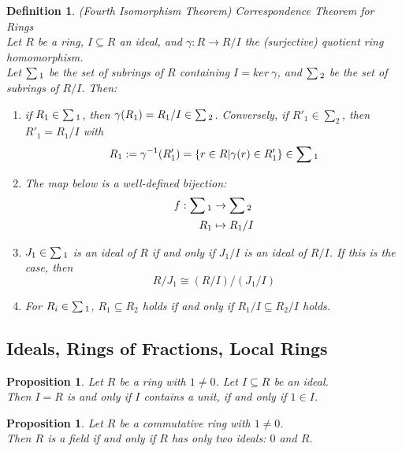 \documentclass[a4paper,8pt]{article}
\newcommand{\hlt}[1]{\textit{{\color{blue}#1}}}
\theoremstyle{theorem}
\newtheorem{proposition}[theorem]{Proposition}
\newtheorem{definition}[theorem]{Definition}
\begin{document}
\begin{definition}
\hlt{(Fourth Isomorphism Theorem)} Correspondence Theorem for Rings\\
Let $R$ be a ring, $I \subseteq R$ an ideal, and $\gamma: R \rightarrow R/I$ the (surjective) quotient ring homomorphism.\\
Let $\sum \textsubscript{1}$ be the set of subrings of $R$ containing $I = ker \ \gamma$, and $\sum \textsubscript{2}$ be the set of subrings of $R/I$. Then:
\begin{enumerate}[label=(\roman*)]
\item if $R_1 \in \sum \textsubscript{1}$, then $\gamma(R_1) = R_1/I \in \sum \textsubscript{2}$. Conversely, if $R'_1 \in \sum_2$, then  $R'_1 = R_1/I$ with
\begin{equation}
R_1:=\gamma^{-1}(R'_1) = \{r\in R | \gamma(r) \in R'_1\} \in \sum \textsubscript{1} \nonumber
\end{equation}
\item The map below is a well-defined bijection:
\begin{align}
f: \sum \textsubscript{1} &\rightarrow \sum \textsubscript{2} \nonumber \\
R_1 &\mapsto R_1/I \nonumber
\end{align}
\item $J_1 \in \sum \textsubscript{1}$ is an ideal of $R$ if and only if $J_1/I$ is an ideal of $R/I$. If this is the case, then 
\begin{equation}
R/J_1 \cong (R/I)/(J_1/I) \nonumber
\end{equation} 
\item For $R_i \in \sum \textsubscript{1}$, $R_1 \subseteq R_2$ holds if and only if $R_1/I \subseteq R_2/I$ holds.
\end{enumerate}
\end{definition}

\subsection{Ideals, Rings of Fractions, Local Rings}

\begin{proposition}
Let $R$ be a ring with $1 \neq 0$. Let $I \subseteq R$ be an ideal.\\
Then $I=R$ is and only if $I$ contains a unit, if and only if $1 \in I$.
\end{proposition}

\begin{proposition}
Let $R$ be a commutative ring with $1 \neq 0$.\\
Then $R$ is a field if and only if $R$ has only two ideals: $0$ and $R$.
\end{proposition}
\end{document}

